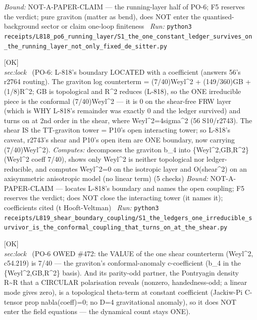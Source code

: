 \begin{description}
 \emph{Bound:} NOT-A-PAPER-CLAIM --- the running-layer half of PO-6; F5 reserves the verdict; pure graviton (matter as bend), does NOT enter the quantised-background sector or claim one-loop finiteness
\ \emph{Run:} \texttt{python3 receipts/L818\_po6\_running\_layer/S1\_the\_one\_constant\_ledger\_survives\_on\_the\_running\_layer\_not\_only\_fixed\_de\_sitter.py}
\item[\label{rcpt:S1_the_ledgers_one_irreducible_survivor_is_the_conformal_coupling_that_turns_on_at_the_shear}\textbf{}\quad\texttt{S1\_the\_ledgers\_one\_irreducible\_survivor\_is\_the\_conformal\_coupling\_that\_turns\_on\_at\_the\_shear}]\hfill\textsf{[OK]}\\
\textit{sec:lock} \ (PO-6: L-818's boundary LOCATED with a coefficient (answers 56's r2764 routing). The graviton log counterterm = (7/40)Weyl\textasciicircum{}2 + (149/360)GB + (1/8)R\textasciicircum{}2; GB is topological and R\textasciicircum{}2 reduces (L-818), so the ONE irreducible piece is the conformal (7/40)Weyl\textasciicircum{}2 --- it is 0 on the shear-free FRW layer (which is WHY L-818's remainder was exactly 0 and the ledger survived) and turns on at 2nd order in the shear, where Weyl\textasciicircum{}2=4sigma\textasciicircum{}2 (56 S10/r2743). The shear IS the TT-graviton tower = P10's open interacting tower; so L-818's caveat, r2743's shear and P10's open item are ONE boundary, now carrying (7/40)Weyl\textasciicircum{}2). 
\emph{Computes:} decomposes the graviton b\_4 into \{Weyl\textasciicircum{}2,GB,R\textasciicircum{}2\} (Weyl\textasciicircum{}2 coeff 7/40), shows only Weyl\textasciicircum{}2 is neither topological nor ledger-reducible, and computes Weyl\textasciicircum{}2=0 on the isotropic layer and O(shear\textasciicircum{}2) on an axisymmetric anisotropic model (no linear term) (5 checks)
 \emph{Bound:} NOT-A-PAPER-CLAIM --- locates L-818's boundary and names the open coupling; F5 reserves the verdict; does NOT close the interacting tower (it names it); coefficients cited (t Hooft-Veltman)
\ \emph{Run:} \texttt{python3 receipts/L819\_shear\_boundary\_coupling/S1\_the\_ledgers\_one\_irreducible\_survivor\_is\_the\_conformal\_coupling\_that\_turns\_on\_at\_the\_shear.py}
\item[\label{rcpt:S1_the_weyl_magnitude_is_the_graviton_c_anomaly_and_the_parity_odd_partner_is_a_theta_term}\textbf{}\quad\texttt{S1\_the\_weyl\_magnitude\_is\_the\_graviton\_c\_anomaly\_and\_the\_parity\_odd\_partner\_is\_a\_theta\_term}]\hfill\textsf{[OK]}\\
\textit{sec:lock} \ (PO-6 OWED \#472: the VALUE of the one shear counterterm (Weyl\textasciicircum{}2, c54.219) is 7/40 --- the graviton's conformal-anomaly c-coefficient (b\_4 in the \{Weyl\textasciicircum{}2,GB,R\textasciicircum{}2\} basis). And its parity-odd partner, the Pontryagin density R\textasciitilde{}R that a CIRCULAR polarisation reveals (nonzero, handedness-odd; a linear mode gives zero), is a topological theta-term at constant coefficient (Jackiw-Pi C-tensor prop nabla(coeff)=0; no D=4 gravitational anomaly), so it does NOT enter the field equations --- the dynamical count stays ONE). 

\end{description}
